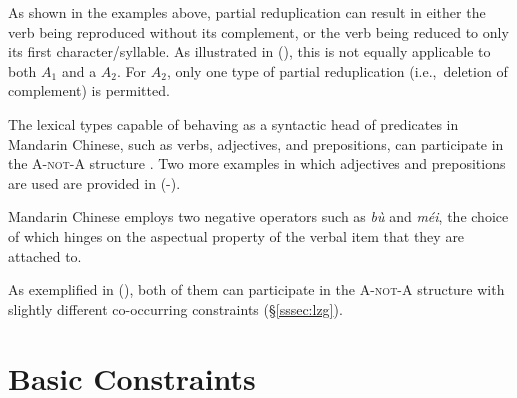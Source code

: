 \documentclass[11pt]{article}
\def\anota{\textsc{A-not-A}}
\def\aone{$A_1$}
\def\atwo{$A_2$}
\newcommand{\myref}[1]{(\getref{#1})}
\begin{document}
\noindent As shown in the examples above, partial reduplication can
result in either the verb being reproduced without its complement, or
the verb being reduced to only its first character/syllable.  As
illustrated in (), this is not
equally applicable to both {\aone}  and a {\atwo}. For {\atwo}, only
one type of partial reduplication (i.e.,\ deletion of complement) is
permitted.  


The lexical types capable of behaving as a syntactic head of predicates
in Mandarin Chinese, such as verbs, adjectives, and prepositions, can
participate in the {\anota} structure \cite{tseng:09}. Two more examples
in which adjectives and prepositions are used are provided in
(-).


{\small 
{}}
\vspace{-20pt}


Mandarin Chinese employs two negative operators such as
 \textit{b\`{u}} and 
\textit{m\'{e}i}, the choice of which hinges on the aspectual property
of the verbal item that they are attached to. 


{\small 
{}}
\vspace{-20pt}


\noindent As exemplified in \myref{exe:neg}, both of them can
participate in the {\anota} structure with slightly different
co-occurring constraints (\S\ref{sssec:lzg}).



\section{Basic Constraints}
\label{sec:constraints}
\end{document}

